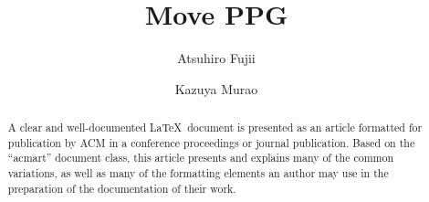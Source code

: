 \documentclass[sigconf]{acmart}
\begin{document}
\title{Move PPG}

\author{Atsuhiro Fujii}

\author{Kazuya Murao}

\renewcommand{\shortauthors}{Atsuhiro Fujii and Kazuya Murao}

\begin{abstract}
  A clear and well-documented \LaTeX\ document is presented as an
  article formatted for publication by ACM in a conference proceedings
  or journal publication. Based on the ``acmart'' document class, this
  article presents and explains many of the common variations, as well
  as many of the formatting elements an author may use in the
  preparation of the documentation of their work.
\end{abstract}
\end{document}
